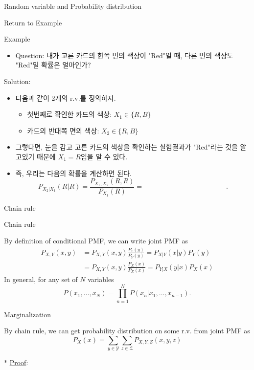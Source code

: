 \documentclass[9pt]{beamer}
\begin{document}
\begin{section}{Random variable and Probability distribution}
\begin{frame}{Return to Example}
\begin{block}{Example}
\begin{itemize}
          \item Question: 내가 고른 카드의 한쪽 면의 색상이 "Red"일 때, 다른 면의 색상도 "Red"일 확률은 얼마인가?
        \end{itemize}
        \end{block}
        \vspace{0.2cm}
        Solution: 
        \vspace{0.1cm}
        \begin{itemize} 
          \item 다음과 같이 2개의 r.v.를 정의하자.
          \begin{itemize}
            \item 첫번째로 확인한 카드의 색상: $X_1 \in \{R, B\}$
            \item 카드의 반대쪽 면의 색상: $X_2 \in \{R, B\}$
          \end{itemize}
          \item 그렇다면, 눈을 감고 고른 카드의 색상을 확인하는 실험결과가 "Red"라는 것을 알고있기 때문에 $X_1 = R$임을 알 수 있다.
          \item 즉, 우리는 다음의 확률을 계산하면 된다.
          $$ P_{X_2|X_1} (R|R) = \frac{P_{X_1, X_2}(R, R)}{P_{X_1}(R)} = \qquad \qquad \qquad  \qquad \qquad \qquad .$$
        \end{itemize}

      \end{frame}
    \end{section}
    \begin{section}{Chain rule}
      \begin{frame}{Chain rule}
        \begin{theorem}
          By definition of conditional PMF, we can write joint PMF as
          \begin{align*} P_{X,Y}(x, y)&=P_{X, Y}(x, y) \frac{P_Y(y)}{P_Y(y)}=P_{X|Y}(x|y) P_Y(y)\\ &= P_{X,Y}(x,y) \frac{P_X(x)}{P_X(x)} = P_{Y|X}(y|x) P_X(x) \end{align*}
          In general, for any set of $N$ variables
          $$ P\left(x_1, \ldots, x_N\right)=\prod_{n=1}^N P\left(x_n | x_1, \ldots, x_{n-1}\right).$$
        \end{theorem}
      \end{frame}
      \begin{frame}{Marginalization}
        \begin{theorem}[marginalization]
          By chain rule, we can get probability distribution on some r.v. from joint PMF as
          $$P_X(x) = \sum_{y \in \mathcal Y} \sum_{z \in \mathcal Z} P_{X, Y, Z}(x, y, z)$$
        \end{theorem}
        $\ast$ \underline{Proof}:
      \end{frame}
    \end{section}
\end{document}
